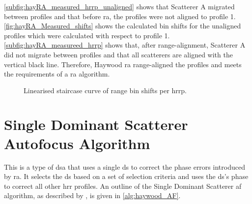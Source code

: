 \documentclass[class=report,11pt,crop=false]{standalone}
\begin{document}
    \autoref{subfig:hayRA_measured_hrrp_unaligned} shows that Scatterer A migrated between profiles and that before \gls{ra}, the profiles were not aligned to profile 1. \autoref{fig:hayRA_Measured_shifts} shows the calculated bin shifts for the unaligned profiles which were calculated with respect to profile 1. \autoref{subfig:hayRA_measureed_hrrp} shows that, after range-alignment, Scatterer A did not migrate between profiles and that all scatterers are aligned with the vertical black line. Therefore, Haywood \gls{ra} range-aligned the profiles and meets the requirements of a \gls{ra} algorithm.
    
    \begin{figure}
        \centering
        \resizebox{0.45\linewidth}{!}{}
        \caption{Linearised staircase curve of range bin shifts per \gls{hrrp}.\label{fig:hayRA_Measured_shifts}}
    \end{figure}

\section{Single Dominant Scatterer Autofocus Algorithm} \label{subsec:hayAF}

This is a type of \gls{dsa} that uses a single \gls{ds} to correct the phase errors introduced by \gls{ra}. It selects the \gls{ds} based on a set of selection criteria and uses the \gls{ds}'s phase to correct all other \gls{hrr} profiles. An outline of the Single Dominant Scatterer \gls{af} algorithm, as described by \cite{haywood_RA_AF}, is given in \autoref{alg:haywood_AF}.
\end{document}
